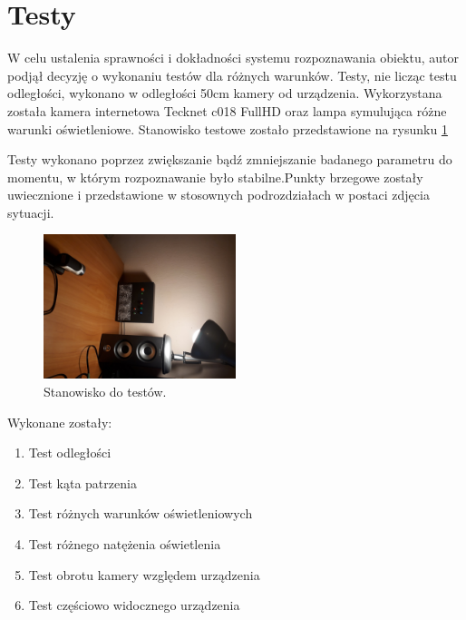\documentclass[12pt,twoside,polish]{article}
\begin{document}
\section{Testy}
W celu ustalenia sprawności i dokładności systemu rozpoznawania obiektu, autor podjął decyzję o wykonaniu testów dla różnych warunków. Testy, nie licząc testu odległości, wykonano w odległości 50cm kamery od urządzenia. Wykorzystana została kamera internetowa Tecknet c018 FullHD oraz lampa symulująca różne warunki oświetleniowe.  Stanowisko testowe zostało przedstawione na rysunku \ref{test_station}

Testy wykonano poprzez zwiększanie bądź zmniejszanie badanego parametru do momentu, w którym rozpoznawanie było stabilne.Punkty brzegowe zostały uwiecznione i przedstawione w stosownych podrozdziałach w postaci zdjęcia sytuacji.

\begin{figure}[h]
	\centering
	\includegraphics[width=0.5\textwidth]{test_stat}
	\caption{Stanowisko do testów.}
	\label{test_station}
\end{figure}

Wykonane zostały:
\begin{enumerate}[label=\alph*), leftmargin=1.25cm]
\item Test odległości
\item Test kąta patrzenia
\item Test różnych warunków oświetleniowych
\item Test różnego natężenia oświetlenia
\item Test obrotu kamery względem urządzenia
\item Test częściowo widocznego urządzenia
\end{enumerate}
\end{document}

